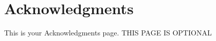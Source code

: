 \documentclass[./dissertation.tex]{subfiles}
\begin{document}
  \chapter*{Acknowledgments}


  This is your Acknowledgments page. THIS PAGE IS OPTIONAL
\end{document}
